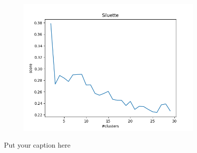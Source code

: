 \documentclass{article}
\begin{document}
\begin{figure}[H]
\begin{subfigure}{.33\textwidth}
  \label{fig:sub-second}
\end{subfigure}
\begin{subfigure}{.33\textwidth}
  \centering
  \includegraphics[width=1\linewidth]{2f/Cats/Siluette.png}  
  
  \label{fig:sub-second}
\end{subfigure}
\caption{Put your caption here}
\label{int f cats}
\end{figure}
\end{document}
